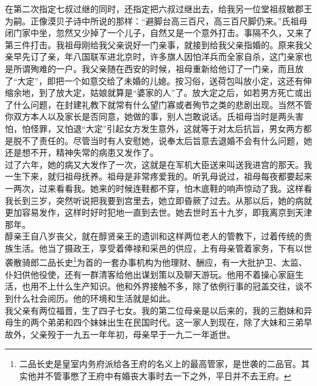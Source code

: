 在第二次指定七叔过继的同时，还指定把六叔过继出去，给我另一位堂祖叔敏郡王为嗣。正像漠贝子诗中所说的那样：“避脚台高三百尺，高三百尺脚仍来。”氏祖母闭门家中坐，忽然又少掉了一个儿子，自然又是一个意外打击。事隔不久，又来了第三件打击。我祖母刚给我父亲说好一门亲事，就接到给我父亲指婚的。原来我父亲早先订了亲，年八国联军进北京时，许多旗人因怕洋兵而全家自杀，这门亲家也是所谓殉难的一户。我父亲随在西安的时候，祖母重新给他订了一门亲，而且放了“大定”，即把一个如意交给了未婚的儿媳。按习俗，送荷包叫放小定，这还有伸缩余地，到了放大定，姑娘就算是“婆家的人”了。放大定之后，如若男方死亡或出了什么问题，在封建礼教下就常有什么望门寡或者殉节之类的悲剧出现。当然不管你双方本人以及家长是否同意，她做的事，别人岂敢说话。氏祖母当时是两头害怕，怕怪罪，又怕退“大定”引起女方发生意外，这就等于对太后抗旨，男女两方都是脱不了责任的。尽管当时有人安慰她，说奉太后旨意去退婚不会有什么问题，她还是想不开，精神失常的病患又发作了。\\

过了六年，她的病又大发作了一次，这就是在军机大臣送来叫送我进宫的那天。我一生下来，就归祖母抚养。祖母是非常疼爱我的。听乳母说过，祖母每夜都要起来一两次，过来看看我。她来的时候连鞋都不穿，怕木底鞋的响声惊动了我。这样看我长到三岁，突然听说把我要到宫里去，她立即昏厥了过去。从那以后，她的病就更加容易发作，这样时好时犯地一直到去世。她去世时五十九岁，即我离京到天津那年。\\

醇亲王自八岁丧父，就在醇贤亲王的遗训和这样两位老人的管教下，过着传统的贵族生活。他当了摄政王，享受着俸禄和采邑的供应，上有母亲管着家务，下有以世袭散骑郎二品长史\footnote{二品长史是皇室内务府派给各王府的名义上的最高管家，是世袭的二品官。其实他并不管事憋了王府中有婚丧大事时去一下之外，平日并不去王府。}为首的一套办事机构为他理财、酬应，有一大批护卫、太监、仆妇供他役使，还有一群清客给他出谋划策以及聊天游玩。他用不着操心家庭生活，也用不上什么生产知识。他和外界接触不多，除了依例行事的冠盖交往，谈不到什么社会阅历。他的环境和生活就是如此。\\

我父亲有两位福晋，生了四子七女。我的第二位母亲是以后来的，我的三胞妹和异母生的两个弟弟和四个妹妹出生在民国时代。这一家人到现在，除了大妹和三弟早故外，父亲殁于一九五一年年初，母亲早于一九二一年逝世。\\

